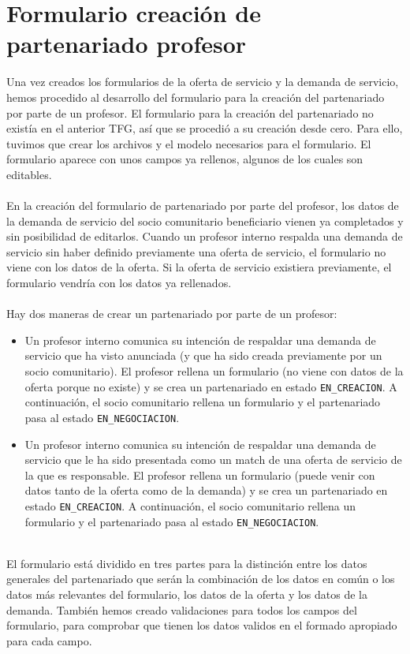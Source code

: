 \documentclass[11pt]{book}
\begin{document}
 \section{Formulario creación de partenariado profesor}
 Una vez creados los formularios de la oferta de servicio y la demanda de servicio, hemos procedido al desarrollo del formulario para la creación del partenariado por parte de un profesor.
 El formulario para la creación del partenariado no existía en el anterior TFG, así que se procedió a su creación desde cero. Para ello, tuvimos que crear los archivos y el modelo necesarios para el formulario. El formulario aparece con unos campos ya rellenos, algunos de los cuales son editables.\\\\
 En la creación del formulario de partenariado por parte del profesor, los datos de la demanda de servicio del socio comunitario beneficiario vienen ya completados y sin posibilidad de editarlos. Cuando un profesor interno respalda una demanda de servicio sin haber definido previamente una oferta de servicio, el formulario no viene con los datos de la oferta. Si la oferta de servicio existiera previamente, el formulario vendría con los datos ya rellenados.\\\\ 
 Hay dos maneras de crear un partenariado por parte de un profesor:
 \begin{itemize}
 	\item Un profesor interno comunica su intención de respaldar una
 	demanda de servicio que ha visto anunciada (y que ha sido creada
 	previamente por un socio comunitario).
 	El profesor rellena un formulario (no viene con datos de la oferta
 	porque no existe) y se crea un partenariado en estado \texttt{EN\_CREACION}.
 	A continuación, el socio comunitario rellena un formulario y el
 	partenariado pasa al estado \texttt{EN\_NEGOCIACION}.
 	\item Un profesor interno comunica su intención de respaldar una
 	demanda de servicio que le ha sido presentada como un match de una
 	oferta de servicio de la que es responsable. El profesor rellena un formulario (puede venir con datos tanto de la oferta como de la demanda) y se crea un partenariado en estado \texttt{EN\_CREACION}. A continuación, el socio comunitario rellena un formulario y el partenariado pasa al estado \texttt{EN\_NEGOCIACION}.\\\\	
 \end{itemize}
 El formulario está dividido en tres partes para la distinción entre los datos generales del partenariado que serán la combinación de los datos en común o los datos más relevantes del formulario, los datos de la oferta y los datos de la demanda. También hemos creado validaciones para todos los campos del formulario, para comprobar que tienen los datos validos en el formado apropiado para cada campo.\\\\
\end{document}
